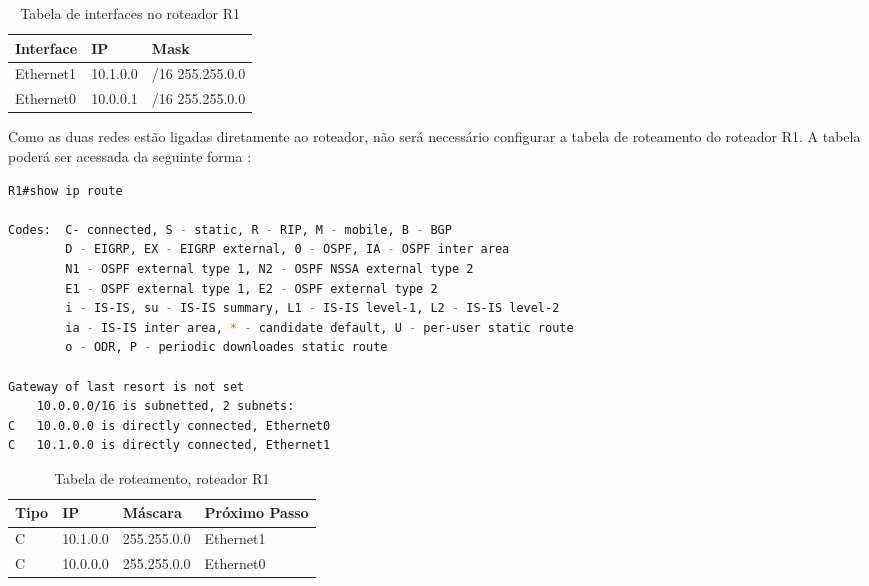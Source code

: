 \begin{table}[H]
\centering
\label{my-label}
\begin{tabular}{lll}
\hline
\multicolumn{1}{|l|}{Interface} & \multicolumn{1}{l|}{IP} & \multicolumn{1}{l|}{Mask} \\ \hline
Ethernet1                       & 10.1.0.0                & /16 255.255.0.0           \\
Ethernet0                       & 10.0.0.1                & /16 255.255.0.0          
\end{tabular}
\caption{Tabela de interfaces no roteador R1}
\end{table}

Como as duas redes estão ligadas diretamente ao roteador, não será necessário configurar a tabela de roteamento do roteador R1. A tabela poderá ser acessada da seguinte forma \cite{9tut} :

\begin{lstlisting}[language=bash]
R1#show ip route

Codes:  C- connected, S - static, R - RIP, M - mobile, B - BGP
        D - EIGRP, EX - EIGRP external, 0 - OSPF, IA - OSPF inter area
        N1 - OSPF external type 1, N2 - OSPF NSSA external type 2
        E1 - OSPF external type 1, E2 - OSPF external type 2
        i - IS-IS, su - IS-IS summary, L1 - IS-IS level-1, L2 - IS-IS level-2
        ia - IS-IS inter area, * - candidate default, U - per-user static route
        o - ODR, P - periodic downloades static route
   
Gateway of last resort is not set
    10.0.0.0/16 is subnetted, 2 subnets:
C   10.0.0.0 is directly connected, Ethernet0
C   10.1.0.0 is directly connected, Ethernet1

\end{lstlisting}

\begin{table}[H]
\centering
\label{my-label}
\begin{tabular}{llll}
\hline
\multicolumn{1}{|l|}{Tipo} & \multicolumn{1}{l|}{IP} & \multicolumn{1}{l|}{Máscara} & \multicolumn{1}{l|}{Próximo Passo} \\ \hline
C                          & 10.1.0.0                & 255.255.0.0                  & Ethernet1                          \\
C                          & 10.0.0.0                & 255.255.0.0                  & Ethernet0                         
\end{tabular}
\caption{Tabela de roteamento, roteador R1}
\end{table}

